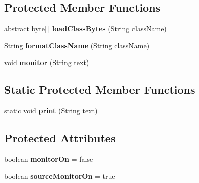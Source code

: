 \subsection*{Protected Member Functions}
\begin{DoxyCompactItemize}
\item 
\hypertarget{classCASUAL_1_1misc_1_1MultiClassLoader_a06b1ad453366a04c4b785c2036c23ec0}{abstract byte\mbox{[}$\,$\mbox{]} {\bfseries load\-Class\-Bytes} (String class\-Name)}\label{classCASUAL_1_1misc_1_1MultiClassLoader_a06b1ad453366a04c4b785c2036c23ec0}

\item 
\hypertarget{classCASUAL_1_1misc_1_1MultiClassLoader_a05e6b596f3d83bab5137a99524a289a2}{String {\bfseries format\-Class\-Name} (String class\-Name)}\label{classCASUAL_1_1misc_1_1MultiClassLoader_a05e6b596f3d83bab5137a99524a289a2}

\item 
\hypertarget{classCASUAL_1_1misc_1_1MultiClassLoader_a182e8bd0d9dc85be69bfb35e10182304}{void {\bfseries monitor} (String text)}\label{classCASUAL_1_1misc_1_1MultiClassLoader_a182e8bd0d9dc85be69bfb35e10182304}

\end{DoxyCompactItemize}
\subsection*{Static Protected Member Functions}
\begin{DoxyCompactItemize}
\item 
\hypertarget{classCASUAL_1_1misc_1_1MultiClassLoader_ac7c710478ced9e94603273414d542b47}{static void {\bfseries print} (String text)}\label{classCASUAL_1_1misc_1_1MultiClassLoader_ac7c710478ced9e94603273414d542b47}

\end{DoxyCompactItemize}
\subsection*{Protected Attributes}
\begin{DoxyCompactItemize}
\item 
\hypertarget{classCASUAL_1_1misc_1_1MultiClassLoader_a2f9e23c25ff8c06ff4202d38ba054dc1}{boolean {\bfseries monitor\-On} = false}\label{classCASUAL_1_1misc_1_1MultiClassLoader_a2f9e23c25ff8c06ff4202d38ba054dc1}

\item 
\hypertarget{classCASUAL_1_1misc_1_1MultiClassLoader_a37d8f5bc87f3fa9dfecd6e83241659a4}{boolean {\bfseries source\-Monitor\-On} = true}\label{classCASUAL_1_1misc_1_1MultiClassLoader_a37d8f5bc87f3fa9dfecd6e83241659a4}

\end{DoxyCompactItemize}


